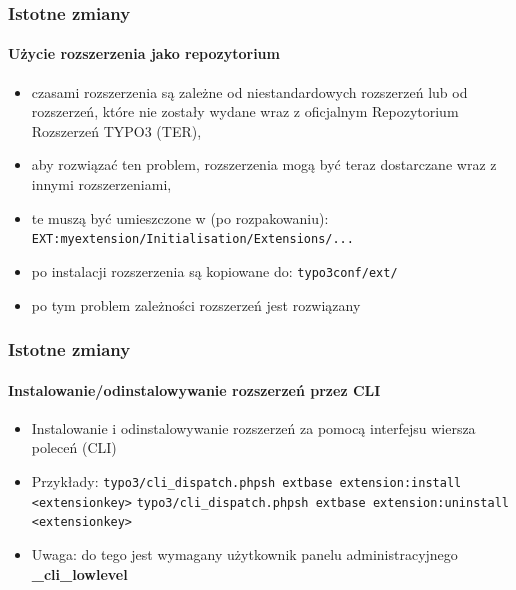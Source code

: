 
\begin{frame}[fragile]
	\frametitle{Istotne zmiany}
	\framesubtitle{Użycie rozszerzenia jako repozytorium}

	\begin{itemize}
		\item czasami rozszerzenia są zależne od niestandardowych rozszerzeń lub od rozszerzeń, które nie zostały wydane wraz z oficjalnym Repozytorium Rozszerzeń TYPO3 (TER),
		\item aby rozwiązać ten problem, rozszerzenia mogą być teraz dostarczane wraz z innymi rozszerzeniami,
		\item te muszą być umieszczone w (po rozpakowaniu):\newline
			\texttt{EXT:myextension/Initialisation/Extensions/...}

		\item po instalacji rozszerzenia są kopiowane do:\newline
			\texttt{typo3conf/ext/}

		\item po tym problem zależności rozszerzeń jest rozwiązany
	\end{itemize}

\end{frame}


\begin{frame}[fragile]
	\frametitle{Istotne zmiany}
	\framesubtitle{Instalowanie/odinstalowywanie rozszerzeń przez CLI}

	\begin{itemize}
		\item Instalowanie i odinstalowywanie rozszerzeń za pomocą interfejsu wiersza poleceń (CLI)
		\item Przykłady:
			\lstinline!typo3/cli_dispatch.phpsh extbase extension:install <extensionkey>!
			\lstinline!typo3/cli_dispatch.phpsh extbase extension:uninstall <extensionkey>!

		\item Uwaga: do tego jest wymagany użytkownik panelu administracyjnego \textbf{\_cli\_lowlevel}
	\end{itemize}

\end{frame}

